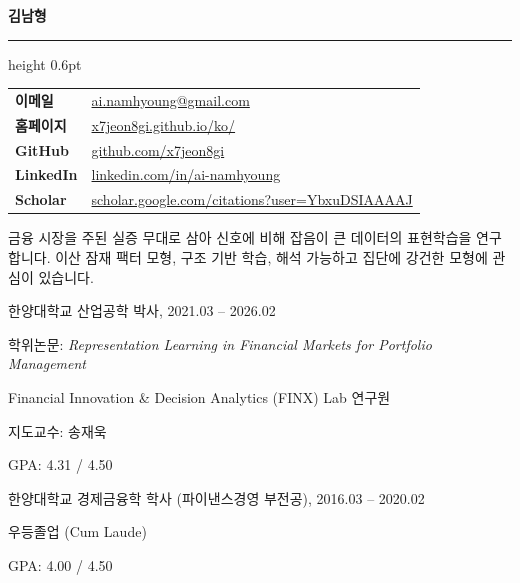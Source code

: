\documentclass[11pt]{article}
\begin{document}
{\color{navy}\huge\bfseries 김남형\hspace{9pt}{\Large Namhyoung Kim}}\par
\vspace{5pt}\hrule height 0.6pt\par
\vspace{12pt}
\begin{tabular}{@{}p{\dimexpr\indB-\tabcolsep\relax}l@{}}
  \textbf{이메일} & \href{mailto:ai.namhyoung@gmail.com}{ai.namhyoung@gmail.com}\\
  \textbf{홈페이지} & \href{https://x7jeon8gi.github.io/ko/}{x7jeon8gi.github.io/ko/}\\
  \textbf{GitHub} & \href{https://github.com/x7jeon8gi}{github.com/x7jeon8gi}\\
  \textbf{LinkedIn} & \href{https://www.linkedin.com/in/ai-namhyoung}{linkedin.com/in/ai-namhyoung}\\
  \textbf{Scholar} & \href{https://scholar.google.com/citations?user=YbxuDSIAAAAJ}{scholar.google.com/citations?user=YbxuDSIAAAAJ}\\
\end{tabular}\par

\begin{ind}
금융 시장을 주된 실증 무대로 삼아 신호에 비해 잡음이 큰 데이터의 표현학습을 연구합니다. 이산 잠재 팩터 모형, 구조 기반 학습, 해석 가능하고 집단에 강건한 모형에 관심이 있습니다.
\end{ind}

\begin{blist}
\item 한양대학교 산업공학 박사, 2021.03 – 2026.02
  \begin{dlist}
  \item 학위논문: \textit{Representation Learning in Financial Markets for Portfolio Management}
  \item Financial Innovation \& Decision Analytics (FINX) Lab 연구원
  \item 지도교수: 송재욱
  \item GPA: 4.31 / 4.50
  \end{dlist}
\item 한양대학교 경제금융학 학사 (파이낸스경영 부전공), 2016.03 – 2020.02
  \begin{dlist}
  \item 우등졸업 (Cum Laude)
  \item GPA: 4.00 / 4.50
  \end{dlist}
\end{blist}
\end{document}

